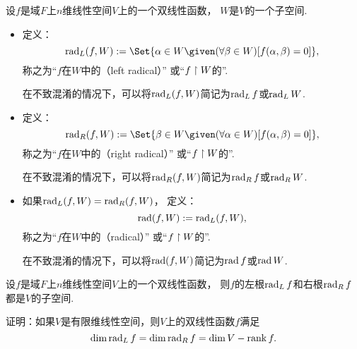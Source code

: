 \begin{definition}
设\(f\)是域\(F\)上\(n\)维线性空间\(V\)上的一个双线性函数，
\(W\)是\(V\)的一个子空间.
\begin{itemize}
	\item 定义：\begin{equation}
		\Rad_L(f,W)
		\defeq
		\Set{
			\alpha \in W
			\given
			(\forall\beta \in W)
			[f(\alpha,\beta) = 0]
		},
	\end{equation}
	称之为“\(f\)在\(W\)中的（left radical）”
	或“\(f \upharpoonright W\)的”.

	在不致混淆的情况下，可以将\(\operatorname{rad}_L(f,W)\)简记为\(\operatorname{rad}_L f\)或\(\operatorname{rad}_L W\).

	\item 定义：\begin{equation}
		\Rad_R(f,W)
		\defeq
		\Set{
			\beta \in W
			\given
			(\forall\alpha \in W)
			[f(\alpha,\beta) = 0]
		},
	\end{equation}
	称之为“\(f\)在\(W\)中的（right radical）”
	或“\(f \upharpoonright W\)的”.

	在不致混淆的情况下，可以将\(\operatorname{rad}_R(f,W)\)简记为\(\operatorname{rad}_R f\)或\(\operatorname{rad}_R W\).

	\item 如果\(\operatorname{rad}_L(f,W) = \operatorname{rad}_R(f,W)\)，
	定义：\begin{equation*}
		\operatorname{rad}(f,W)
		:=
		\operatorname{rad}_L(f,W),
	\end{equation*}
	称之为“\(f\)在\(W\)中的（radical）”
	或“\(f \upharpoonright W\)的”.

	在不致混淆的情况下，可以将\(\operatorname{rad}(f,W)\)简记为\(\operatorname{rad} f\)或\(\operatorname{rad} W\).
\end{itemize}
\end{definition}

\begin{proposition}
设\(f\)是域\(F\)上\(n\)维线性空间\(V\)上的一个双线性函数，
则\(f\)的左根\(\operatorname{rad}_L f\)和右根\(\operatorname{rad}_R f\)都是\(V\)的子空间.
\end{proposition}

\begin{example}
证明：如果\(V\)是有限维线性空间，则\(V\)上的双线性函数\(f\)满足\begin{equation*}
	\dim\operatorname{rad}_L f
	= \dim\operatorname{rad}_R f
	= \dim V - \rank f.
\end{equation*}
\end{example}

